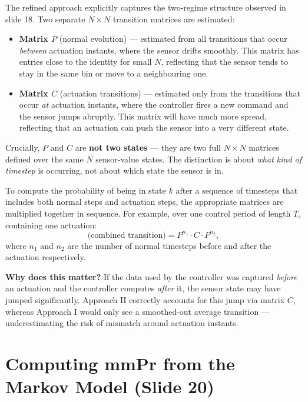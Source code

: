 The refined approach explicitly captures the two-regime structure observed
in slide 18. Two separate $N \times N$ transition matrices are estimated:
 
\begin{itemize}[leftmargin=2em]
  \item \textbf{Matrix $P$} (normal evolution) --- estimated from all
        transitions that occur \emph{between} actuation instants, where the
        sensor drifts smoothly. This matrix has entries close to the identity
        for small $N$, reflecting that the sensor tends to stay in the same
        bin or move to a neighbouring one.
 
  \item \textbf{Matrix $C$} (actuation transitions) --- estimated only from
        the transitions that occur \emph{at} actuation instants, where the
        controller fires a new command and the sensor jumps abruptly. This
        matrix will have much more spread, reflecting that an actuation can
        push the sensor into a very different state.
\end{itemize}
 
Crucially, $P$ and $C$ are \textbf{not two states} --- they are two full
$N \times N$ matrices defined over the same $N$ sensor-value states. The
distinction is about \emph{what kind of timestep} is occurring, not about
which state the sensor is in.
 
To compute the probability of being in state $k$ after a sequence of
timesteps that includes both normal steps and actuation steps, the
appropriate matrices are multiplied together in sequence. For example, over
one control period of length $T_s$ containing one actuation:
\[
  \text{(combined transition)} = P^{n_1} \cdot C \cdot P^{n_2},
\]
where $n_1$ and $n_2$ are the number of normal timesteps before and after
the actuation respectively.
 
\begin{insightbox}
\textbf{Why does this matter?} If the data used by the controller was
captured \emph{before} an actuation and the controller computes \emph{after}
it, the sensor state may have jumped significantly. Approach II correctly
accounts for this jump via matrix $C$, whereas Approach I would only see a
smoothed-out average transition --- underestimating the risk of mismatch
around actuation instants.
\end{insightbox}
 
\section{Computing mmPr from the Markov Model (Slide 20)}
 

